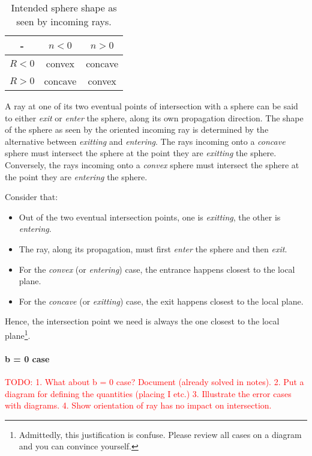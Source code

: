 \begin{table} \caption{\label{tab:sphere-definition-cases} Intended sphere
shape as seen by incoming rays.}
\begin{tabular}{| c | c | c |} \hline
-       & $n < 0$ & $n > 0$ \\ \hline
$R < 0$ & convex  & concave \\ \hline
$R > 0$ & concave & convex  \\
\hline \end{tabular} \end{table}

A ray at one of its two eventual points of intersection with a sphere can be
said to either \emph{exit} or \emph{enter} the sphere, along its own
propagation direction. The shape of the sphere as seen by the oriented incoming
ray is determined by the alternative between \emph{exitting} and
\emph{entering}.  The rays incoming onto a \emph{concave} sphere must intersect
the sphere at the point they are \emph{exitting} the sphere.  Conversely, the
rays incoming onto a \emph{convex} sphere must intersect the sphere at the
point they are \emph{entering} the sphere.

Consider that: \begin{itemize}
\item Out of the two eventual intersection points, one is \emph{exitting},
the other is \emph{entering}.
\item The ray, along its propagation, must first \emph{enter} the sphere
      and then \emph{exit}.
\item For the \emph{convex} (or \emph{entering}) case, the entrance
happens closest to the local plane.
\item For the \emph{concave} (or \emph{exitting}) case, the exit
happens closest to the local plane.
\end{itemize}

Hence, the intersection point we need is always the one closest to the
local plane\footnote{Admittedly, this justification is confuse. Please
review all cases on a diagram and you can convince yourself.}.

\paragraph{b = 0 case}

\textcolor{red}{TODO:
1. What about b = 0 case? Document (already solved in notes).
2. Put a diagram for defining the quantities (placing I etc.)
3. Illustrate the error cases with diagrams.
4. Show orientation of ray has no impact on intersection.}

